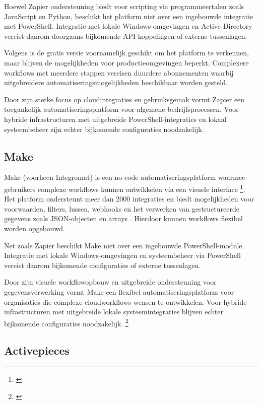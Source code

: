 Hoewel Zapier ondersteuning biedt voor scripting via programmeertalen zoals JavaScript en Python, beschikt het platform niet over een ingebouwde integratie met PowerShell. Integratie met lokale Windows-omgevingen en Active Directory vereist daarom doorgaans bijkomende API-koppelingen of externe tussenlagen.

Volgens \textcite{Baserow2025} is de gratis versie voornamelijk geschikt om het platform te verkennen, maar blijven de mogelijkheden voor productieomgevingen beperkt. Complexere workflows met meerdere stappen vereisen duurdere abonnementen waarbij uitgebreidere automatiseringsmogelijkheden beschikbaar worden gesteld.

Door zijn sterke focus op cloudintegraties en gebruiksgemak vormt Zapier een toegankelijk automatiseringsplatform voor algemene bedrijfsprocessen. Voor hybride infrastructuren met uitgebreide PowerShell-integraties en lokaal systeembeheer zijn echter bijkomende configuraties noodzakelijk.

\subsection{Make}

Make (voorheen Integromat) is een no-code automatiseringsplatform waarmee gebruikers complexe workflows kunnen ontwikkelen via een visuele interface \footnote{\autocite{Digidop}}. Het platform ondersteunt meer dan 2000 integraties en biedt mogelijkheden voor voorwaarden, filters, lussen, webhooks en het verwerken van gestructureerde gegevens zoals JSON-objecten en arrays \autocite{Nwibe2026}. Hierdoor kunnen workflows flexibel worden opgebouwd.

Net zoals Zapier beschikt Make niet over een ingebouwde PowerShell-module. Integratie met lokale Windows-omgevingen en systeembeheer via PowerShell vereist daarom bijkomende configuraties of externe tussenlagen.

Door zijn visuele workflowopbouw en uitgebreide ondersteuning voor gegevensverwerking vormt Make een flexibel automatiseringsplatform voor organisaties die complexe cloudworkflows wensen te ontwikkelen. Voor hybride infrastructuren met uitgebreide lokale systeemintegraties blijven echter bijkomende configuraties noodzakelijk. \footnote{\autocite{Make}}

\subsection{Activepieces}

